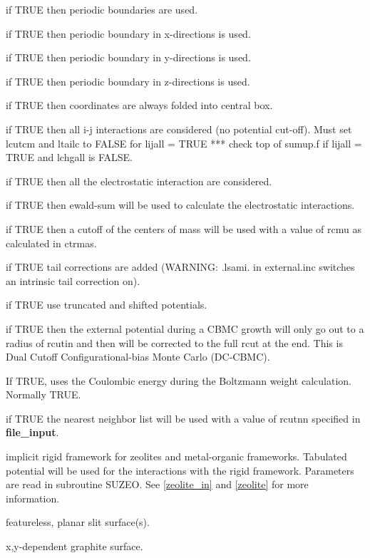 \documentclass[12pt,letterpaper]{article}
\begin{document}
 if TRUE then periodic boundaries are used.

 if TRUE then periodic boundary in x-directions is used.

 if TRUE then periodic boundary in y-directions is used.

 if TRUE then periodic boundary in z-directions is used.

 if TRUE then coordinates are always folded into central box.

 if TRUE then all i-j interactions are
considered (no potential cut-off). Must set lcutcm and
ltailc to FALSE for lijall = TRUE *** check top of sumup.f
if lijall = TRUE and lchgall is FALSE.

 if TRUE then all the electrostatic
interaction are considered.

 if TRUE then ewald-sum will be used to
calculate the electrostatic interactions.

 if TRUE then a cutoff of the centers
of mass will be used with a value of rcmu as calculated in
ctrmas.

 if TRUE tail corrections are added
(WARNING: .lsami. in external.inc switches an intrinsic tail
correction on).

 if TRUE use truncated and shifted potentials.

 if TRUE then the external potential
during a CBMC growth will only go out to a radius of rcutin
and then will be corrected to the full rcut at the end. This
is Dual Cutoff Configurational-bias Monte Carlo (DC-CBMC).

 If TRUE, uses the Coulombic
energy during the Boltzmann weight calculation. Normally
TRUE.

 if TRUE the nearest neighbor list will
be used with a value of rcutnn specified in {\bf
  file\_input}.

 implicit rigid framework for zeolites
and metal-organic frameworks. Tabulated potential will be
used for the interactions with the rigid framework.
Parameters are read in subroutine SUZEO. See
\ref{zeolite_in} and \ref{zeolite} for more information.

 featureless, planar slit surface(s).

 x,y-dependent graphite surface.
\end{document}
